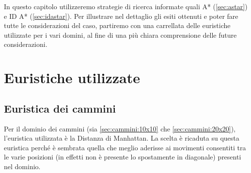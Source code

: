 In questo capitolo utilizzeremo strategie di ricerca informate quali A* (\ref{sec:astar}) e ID A* (\ref{sec:idastar}). Per illustrare nel dettaglio gli esiti ottenuti e poter fare tutte le considerazioni del caso, partiremo con una carrellata delle euristiche utilizzate per i vari domini, al fine di una più chiara comprensione delle future considerazioni.

\section{Euristiche utilizzate}

\subsection{Euristica dei cammini}
Per il dominio dei cammini (sia \ref{sec:cammini:10x10} che \ref{sec:cammini:20x20}), l'euristica utilizzata è la Distanza di Manhattan. La scelta è ricaduta su questa euristica perché è sembrata quella che meglio aderisse ai movimenti consentiti tra le varie posizioni (in effetti non è presente lo spostamente in diagonale) presenti nel dominio.

